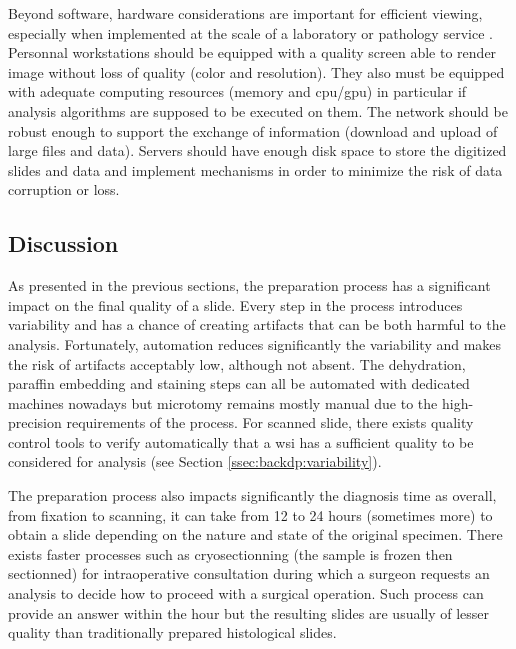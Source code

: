 Beyond software, hardware considerations are important for efficient viewing, especially when implemented at the scale of a laboratory or pathology service \parencite{temprana2022digipatics}. Personnal workstations should be equipped with a quality screen able to render image without loss of quality (color and resolution). They also must be equipped with adequate computing resources (memory and \acrshort{cpu}/\acrshort{gpu}) in particular if analysis algorithms are supposed to be executed on them. The network should be robust enough to support the exchange of information (\ie download and upload of large files and data). Servers should have enough disk space to store the digitized slides and data and implement mechanisms in order to minimize the risk of data corruption or loss. 


\subsection{Discussion}

As presented in the previous sections, the preparation process has a significant impact on the final quality of a slide. Every step in the process introduces variability and has a chance of creating artifacts that can be both harmful to the analysis. Fortunately, automation reduces significantly the variability and makes the risk of artifacts acceptably low, although not absent. The dehydration, paraffin embedding and staining steps can all be automated with dedicated machines nowadays but microtomy remains mostly manual due to the high-precision requirements of the process.  For scanned slide, there exists quality control tools to verify automatically that a \acrshort{wsi} has a sufficient quality to be considered for analysis (see Section \ref{ssec:backdp:variability}). 

The preparation process also impacts significantly the diagnosis time as overall, from fixation to scanning, it can take from 12 to 24 hours (sometimes more) to obtain a slide depending on the nature and state of the original specimen. There exists faster processes such as cryosectionning (\ie the sample is frozen then sectionned) for intraoperative consultation during which a surgeon requests an analysis to decide how to proceed with a surgical operation. Such process can provide an answer within the hour but the resulting slides are usually of lesser quality than traditionally prepared histological slides.

